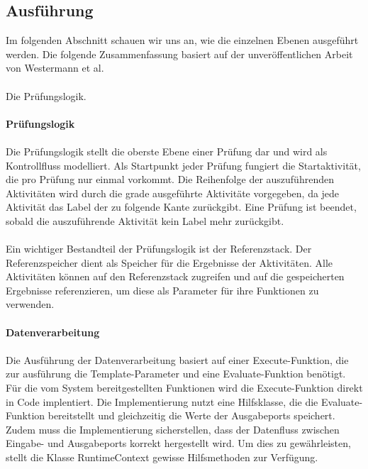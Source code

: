 \documentclass{article}
\begin{document}
    \subsection{Ausführung}
    Im folgenden Abschnitt schauen wir uns an, wie die einzelnen Ebenen ausgeführt werden.
    Die folgende Zusammenfassung basiert auf der unveröffentlichen Arbeit von Westermann et al.\\\\
    Die Prüfungslogik.\\
    \\
    \textbf{Prüfungslogik}\\
    \\
    Die Prüfungslogik stellt die oberste Ebene einer Prüfung dar und wird als Kontrollfluss modelliert.
    Als Startpunkt jeder Prüfung fungiert die Startaktivität, die pro Prüfung nur einmal vorkommt.
    Die Reihenfolge der auszuführenden Aktivitäten wird durch die grade ausgeführte Aktivitäte vorgegeben, da jede Aktivität das Label der zu folgende Kante zurückgibt.
    Eine Prüfung ist beendet, sobald die auszuführende Aktivität kein Label mehr zurückgibt.\\
    \\
    Ein wichtiger Bestandteil der Prüfungslogik ist der Referenzstack. Der Referenzspeicher dient als Speicher für die Ergebnisse der Aktivitäten.
    Alle Aktivitäten können auf den Referenzstack zugreifen und auf die gespeicherten Ergebnisse referenzieren, um diese als Parameter für ihre Funktionen zu verwenden.\\
    \\
    \textbf{Datenverarbeitung}\\
    \\
    Die Ausführung der Datenverarbeitung basiert auf einer Execute-Funktion, die zur ausführung die Template-Parameter und eine Evaluate-Funktion benötigt.
    Für die vom System bereitgestellten Funktionen wird die Execute-Funktion direkt in Code implentiert. 
    Die Implementierung nutzt eine Hilfsklasse, die die Evaluate-Funktion bereitstellt und gleichzeitig die Werte der Ausgabeports speichert.
    Zudem muss die Implementierung sicherstellen, dass der Datenfluss zwischen Eingabe- und Ausgabeports korrekt hergestellt wird. Um dies zu gewährleisten, stellt die Klasse RuntimeContext gewisse Hilfsmethoden zur Verfügung.
    
\end{document}
